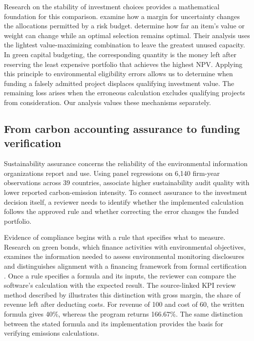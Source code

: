 Research on the stability of investment choices provides a mathematical foundation for this comparison. \citet{hien} examine how a margin for uncertainty changes the allocations permitted by a risk budget. \citet{pisinger} determine how far an item's value or weight can change while an optimal selection remains optimal. Their analysis uses the lightest value-maximizing combination to leave the greatest unused capacity. In green capital budgeting, the corresponding quantity is the money left after reserving the least expensive portfolio that achieves the highest NPV. Applying this principle to environmental eligibility errors allows us to determine when funding a falsely admitted project displaces qualifying investment value. The remaining loss arises when the erroneous calculation excludes qualifying projects from consideration. Our analysis values these mechanisms separately.

\subsection{From carbon accounting assurance to funding verification}
Sustainability assurance concerns the reliability of the environmental information organizations report and use. Using panel regressions on 6,140 firm-year observations across 39 countries, \citet{ibrahim2026} associate higher sustainability audit quality with lower reported carbon-emission intensity. To connect assurance to the investment decision itself, a reviewer needs to identify whether the implemented calculation follows the approved rule and whether correcting the error changes the funded portfolio.

Evidence of compliance begins with a rule that specifies what to measure. Research on green bonds, which finance activities with environmental objectives, examines the information needed to assess environmental monitoring disclosures \citep{nicolici} and distinguishes alignment with a financing framework from formal certification \citep{loiola}. Once a rule specifies a formula and its inputs, the reviewer can compare the software's calculation with the expected result. The source-linked KPI review method described by \citet{review} illustrates this distinction with gross margin, the share of revenue left after deducting costs. For revenue of 100 and cost of 60, the written formula gives 40\%, whereas the program returns 166.67\%. The same distinction between the stated formula and its implementation provides the basis for verifying emissions calculations.

